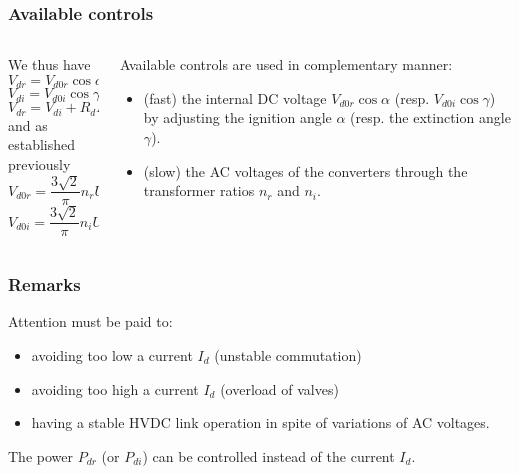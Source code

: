 \begin{frame}
\frametitle{Available controls}
\begin{columns}
\begin{column}{0.5\linewidth}
We thus have
$$ V_{dr} = V_{d0r} \cos \alpha - R_{cr} I_d $$
$$ V_{di} = V_{d0i} \cos \gamma - R_{ci} I_d $$
$$ V_{dr} = V_{di} + R_d I_d $$
and as established previously
$$V_{d0r} = \frac{3 \sqrt{2}}{\pi} n_r U_r $$
$$V_{d0i} = \frac{3 \sqrt{2}}{\pi} n_i U_i$$
\end{column}
\begin{column}{0.5\linewidth}
Available controls are used in complementary manner:
\begin{itemize}
    \item (fast) the internal DC voltage $V_{d0r}\cos \alpha$ (resp. $V_{d0i}\cos \gamma$) by adjusting the ignition angle $\alpha$
     (resp. the extinction angle $\gamma$).
    \item (slow) the AC voltages of the converters through the transformer ratios $n_r$ and $n_i$.
\end{itemize}
\end{column}
\end{columns}
\end{frame}

\begin{frame}
\frametitle{Remarks}
Attention must be paid to:
\begin{itemize}
    \item avoiding too low a current $I_d$ (unstable commutation)
    \item avoiding too high a current $I_d$ (overload of valves)
    \item having a stable HVDC link operation in spite of variations of AC voltages.
\end{itemize}
The power $P_{dr}$ (or $P_{di}$) can be controlled instead of the current $I_d$.
\end{frame}

